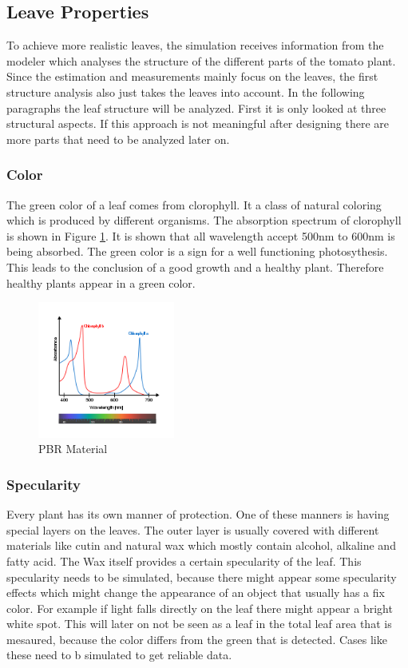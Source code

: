 
\graphicspath{{members/kh/Pictures/}}

\subsection{Leave Properties}

To achieve more realistic leaves, the simulation receives information from the modeler which analyses the structure of the different parts of the tomato plant. Since the estimation and measurements mainly focus on the leaves, the first structure analysis also just takes the leaves into account.
In the following paragraphs the leaf structure will be analyzed. First it is only looked at three structural aspects. If this approach is not meaningful after designing there are more parts that need to be analyzed later on.

\subsubsection*{Color}
The green color of a leaf comes from clorophyll. It a class of natural coloring which is produced by different organisms. 
The absorption spectrum of clorophyll is shown in Figure \ref{clorophyll}. It is shown that all wavelength accept 500nm to 600nm is being absorbed. The green color is a sign for a well functioning  photosythesis. This leads to the conclusion of a good growth and a healthy plant. Therefore healthy plants appear in a green color.

\begin{figure}[h]
	\centering
	\includegraphics[width=0.4\textwidth]{wavelength.png}
	\caption{PBR Material}
	\label{clorophyll}
\end{figure}

\subsubsection*{Specularity}
Every plant has its own manner of protection. One of these manners is having special layers on the leaves. The outer layer is usually covered with different materials like cutin and natural wax which mostly contain  alcohol, alkaline and fatty acid. The Wax itself provides a certain specularity of the leaf. This specularity needs to be simulated, because there might appear some specularity effects which might change the appearance of an object that usually has a fix color. For example if light falls directly on the leaf there might appear a bright white spot. This will later on not be seen as a leaf in the total leaf area that is mesaured, because the color differs from the green that is detected. Cases like these need to b simulated to get reliable data.

